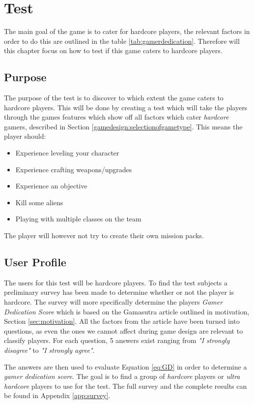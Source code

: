 \chapter{Test}
The main goal of the game is to cater for hardcore players, the relevant factors in order to do this are outlined in the table \ref{tab:gamerdedication}.
Therefore will this chapter focus on how to test if this game caters to hardcore players.

\section{Purpose}
The purpose of the test is to discover to which extent the game caters to hardcore players.
This will be done by creating a test which will take the players through the games features which show off all factors which cater \emph{hardcore} gamers, described in Section \ref{gamedesign:selectionofgametype}.
This means the player should:
\begin{itemize}
	\item Experience leveling your character
	\item Experience crafting weapons/upgrades
	\item Experience an objective
	\item Kill some aliens
	\item Playing with multiple classes on the team
\end{itemize}
The player will however not try to create their own mission packs.

\section{User Profile}
The users for this test will be hardcore players.
To find the test subjects a preliminary survey has been made to determine whether or not the player is hardcore.
The survey will more specifically determine the players \textit{Gamer Dedication Score} which is based on the Gamasutra article\cite{casual_vs_hardcore} outlined in motivation, Section \ref{sec:motivation}.
All the factors from the article have been turned into questions, as even the ones we cannot affect during game design are relevant to classify players.
For each question, 5 answers exist ranging from \textit{"I strongly disagree"} to \textit{"I strongly agree"}.

The answers are then used to evaluate Equation \ref{eq:GD} in order to determine a \emph{gamer dedication score}.
The goal is to find a group of \emph{hardcore} players or \emph{ultra hardcore} players to use for the test.
The full survey and the complete results can be found in Appendix \ref{app:survey}.

